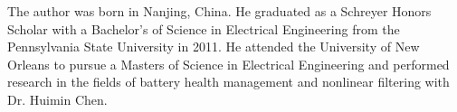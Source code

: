 The author was born in Nanjing, China. He graduated as a Schreyer Honors Scholar with a Bachelor's of Science in Electrical Engineering from the Pennsylvania State University in 2011. He attended the University of New Orleans to pursue a Masters of Science in Electrical Engineering and performed research in the fields of battery health management and nonlinear filtering with Dr. Huimin Chen.

